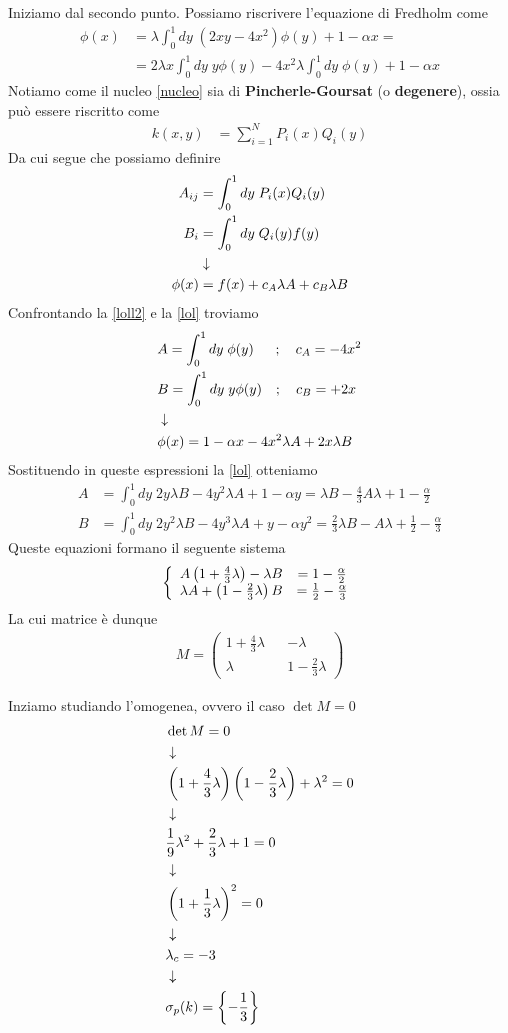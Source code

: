 Iniziamo dal secondo punto. Possiamo riscrivere l'equazione di Fredholm come
\begin{align}
	\phi(x) &= \lambda \int_{0}^{1} dy \; (2xy-4x^2) \phi(y) + 1 -\alpha x = \nonumber\\
	&= 2\lambda x \int_{0}^{1} dy \; y\phi(y) - 4x^2 \lambda \int_{0}^{1} dy \; \phi(y) + 1 -\alpha x \label{lol}
\end{align}
Notiamo come il nucleo \ref{nucleo} sia di \textbf{Pincherle-Goursat} (o \textbf{degenere}), ossia può essere riscritto come 
\begin{align}
	k(x,y) &= \sum_{i=1}^{N} P_i(x)Q_i(y)   
\end{align}
Da cui segue che possiamo definire
\begin{align}
	A_{ij} &= \int_{0}^{1} dy \; P_i(x)Q_i(y)\\
	B_i &= \int_{0}^{1} dy \; Q_i(y)f(y) \\ &\downarrow \nonumber \\
	\phi(x) &= f(x)+ c_A\lambda A + c_B\lambda B \label{loll2}
\end{align}
Confrontando la \ref{loll2} e la \ref{lol} troviamo 
\begin{align}
	&A = \int_{0}^{1} dy \; \phi(y)\;\; \quad ; \quad c_A = -4x^2\\
	&B = \int_{0}^{1} dy \; y\phi(y) \quad ; \quad c_B = +2x \\ &\downarrow \nonumber \\
	&\phi(x) =1 -\alpha x -4x^2 \lambda A + 2x\lambda B 
\end{align}
Sostituendo in queste espressioni la \ref{lol} otteniamo
\begin{align}
	A &= \int_{0}^{1} dy \; 2y\lambda B - 4y^2 \lambda A + 1 -\alpha y = \lambda B - \frac{4}{3} A \lambda +1 - \frac{\alpha}{2}\\
	B &= \int_{0}^{1} dy \; 2y^2\lambda B - 4y^3 \lambda A + y -\alpha y^2 = \frac{2}{3}\lambda B - A \lambda +\frac{1}{2} - \frac{\alpha}{3}
\end{align}
Queste equazioni formano il seguente sistema
\begin{align}
	\left\{ \begin{array}{cc} A\left(1+\frac{4}{3} \lambda\right) -\lambda B &= 1 -\frac{\alpha}{2}\\ \lambda A + \left(1 - \frac{2}{3} \lambda \right)B &= \frac{1}{2} - \frac{\alpha}{3} \end{array} \right.
\end{align}
La cui matrice è dunque
\begin{align}
	M = \begin{pmatrix}
		1+\frac{4}{3} \lambda && - \lambda \\
		\lambda && 1-\frac{2}{3} \lambda
	\end{pmatrix}
\end{align}

Inziamo studiando l'omogenea, ovvero il caso $\det M=0$
\begin{align}
	&\det M = 0 \\ &\downarrow \nonumber \\
	&\left( 1+\frac{4}{3} \lambda \right) \left( 1-\frac{2}{3} \lambda \right) + \lambda^2 =0 \nonumber \\ &\downarrow \nonumber \\
	& \frac{1}{9} \lambda^2 + \frac{2}{3} \lambda +1 = 0\nonumber \\ &\downarrow \nonumber \\
	& \left( 1+\frac{1}{3} \lambda \right)^2 = 0 \nonumber \\ &\downarrow \nonumber \\
	& \lambda_c = -3 \nonumber \\ &\downarrow \nonumber \\
	&\sigma_p(k) = \left\{ -\frac{1}{3} \right\}
\end{align}

